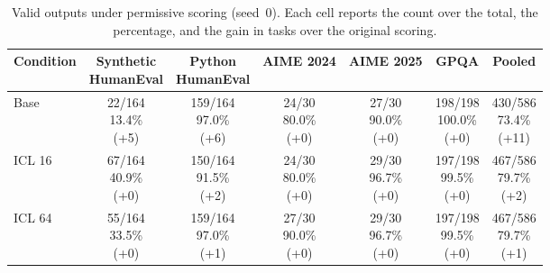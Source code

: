 \begin{table}[htbp]
\begin{tabular}{@{}lcccccc@{}}
\hline
\end{tabular}
\end{table}

\begin{table}[htbp]
\centering
\footnotesize
\setlength{\tabcolsep}{7pt}
\renewcommand{\arraystretch}{1.5}
\caption{Valid outputs under permissive scoring (seed~0). Each cell reports the count over the total, the percentage, and the gain in tasks over the original scoring.}
\label{tab:generous-seed0-valid}
\begin{tabular}{@{}lcccccc@{}}
\hline
Condition & \shortstack{Synthetic\\[3pt]HumanEval} & \shortstack{Python\\[3pt]HumanEval} & AIME 2024 & AIME 2025 & GPQA & Pooled \\
\hline
Base & \shortstack{22/164\\[3pt]13.4\%\\[3pt](+5)} & \shortstack{159/164\\[3pt]97.0\%\\[3pt](+6)} & \shortstack{24/30\\[3pt]80.0\%\\[3pt](+0)} & \shortstack{27/30\\[3pt]90.0\%\\[3pt](+0)} & \shortstack{198/198\\[3pt]100.0\%\\[3pt](+0)} & \shortstack{430/586\\[3pt]73.4\%\\[3pt](+11)} \\[8pt]
ICL 16 & \shortstack{67/164\\[3pt]40.9\%\\[3pt](+0)} & \shortstack{150/164\\[3pt]91.5\%\\[3pt](+2)} & \shortstack{24/30\\[3pt]80.0\%\\[3pt](+0)} & \shortstack{29/30\\[3pt]96.7\%\\[3pt](+0)} & \shortstack{197/198\\[3pt]99.5\%\\[3pt](+0)} & \shortstack{467/586\\[3pt]79.7\%\\[3pt](+2)} \\[8pt]
ICL 64 & \shortstack{55/164\\[3pt]33.5\%\\[3pt](+0)} & \shortstack{159/164\\[3pt]97.0\%\\[3pt](+1)} & \shortstack{27/30\\[3pt]90.0\%\\[3pt](+0)} & \shortstack{29/30\\[3pt]96.7\%\\[3pt](+0)} & \shortstack{197/198\\[3pt]99.5\%\\[3pt](+0)} & \shortstack{467/586\\[3pt]79.7\%\\[3pt](+1)} \\[8pt]

\end{tabular}
\end{table}
